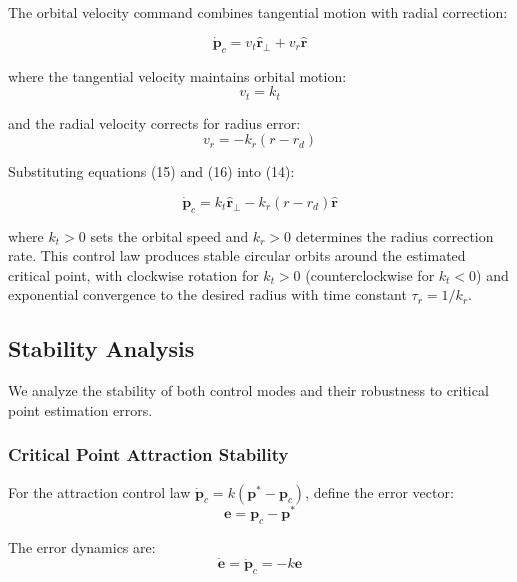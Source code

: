\documentclass[lettersize,journal]{IEEEtran}
\begin{document}
The orbital velocity command combines tangential motion with radial correction:

\begin{equation}
\dot{\mathbf{p}}_c = v_t \hat{\mathbf{r}}_\perp + v_r \hat{\mathbf{r}}
\end{equation}

where the tangential velocity maintains orbital motion:
\begin{equation}
v_t = k_t
\end{equation}

and the radial velocity corrects for radius error:
\begin{equation}
v_r = -k_r(r - r_d)
\end{equation}


Substituting equations (15) and (16) into (14):

\begin{equation}
\dot{\mathbf{p}}_c = k_t \hat{\mathbf{r}}_\perp - k_r(r - r_d)\hat{\mathbf{r}}
\end{equation}

where $k_t > 0$ sets the orbital speed and $k_r > 0$ determines the radius correction rate. This control law produces stable circular orbits around the estimated critical point, with clockwise rotation for $k_t > 0$ (counterclockwise for $k_t < 0$) and exponential convergence to the desired radius with time constant $\tau_r = 1/k_r$.


\subsection{Stability Analysis}

We analyze the stability of both control modes and their robustness to critical point estimation errors.

\subsubsection{Critical Point Attraction Stability}

For the attraction control law $\dot{\mathbf{p}}_c = k(\mathbf{p}^* - \mathbf{p}_c)$, define the error vector:
\begin{equation}
\mathbf{e} = \mathbf{p}_c - \mathbf{p}^*
\end{equation}

The error dynamics are:
\begin{equation}
\dot{\mathbf{e}} = \dot{\mathbf{p}}_c = -k\mathbf{e}
\end{equation}
\end{document}
